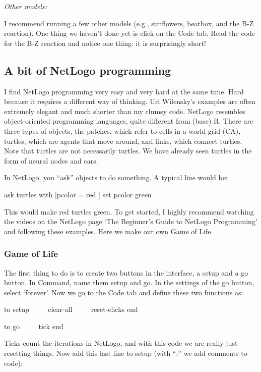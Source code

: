 \documentclass[
  a4paper,
  DIV=11,
  numbers=noendperiod,
  oneside]{scrreprt}
\begin{document}
\emph{Other models:}

I recommend running a few other models (e.g., sunflowers, beatbox, and
the B-Z reaction). One thing we haven't done yet is click on the Code
tab. Read the code for the B-Z reaction and notice one thing: it is
surprisingly short!

\hypertarget{sec-A-bit-of-NetLogo-programming}{%
\subsection{A bit of NetLogo
programming}\label{sec-A-bit-of-NetLogo-programming}}

I find NetLogo programming very easy and very hard at the same time.
Hard because it requires a different way of thinking. Uri Wilensky's
examples are often extremely elegant and much shorter than my clumsy
code. NetLogo resembles object-oriented programming languages, quite
different from (base) R. There are three types of objects, the patches,
which refer to cells in a world grid (CA), turtles, which are agents
that move around, and links, which connect turtles. Note that turtles
are not necessarily turtles. We have already seen turtles in the form of
neural nodes and cars.

In NetLogo, you ``ask'' objects to do something. A typical line would
be:

{ask} {turtles with} {{[}}{pcolor =} {red} {]} {set} {pcolor} {green}

This would make red turtles green. To get started, I highly recommend
watching the videos on the NetLogo page `The Beginner's Guide to NetLogo
Programming' and following these examples. Here we make our own Game of
Life.

\hypertarget{sec-Game-of-Life}{%
\subsubsection{Game of Life}\label{sec-Game-of-Life}}

The first thing to do is to create two buttons in the interface, a setup
and a go button. In Command, name them setup and go. In the settings of
the go button, select `forever'. Now we go to the Code tab and define
these two functions as:

{to} {setup} ~~~~ {clear-all} ~~~~ {reset-clicks} {end}

{to} {go} ~~~~ {tick} {end}

Ticks count the iterations in NetLogo, and with this code we are really
just resetting things. Now add this last line to setup (with ``;'' we
add comments to code):
\end{document}
